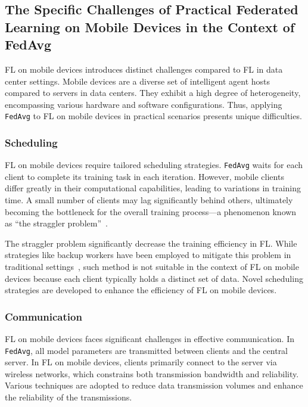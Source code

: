 \documentclass[conference]{IEEEtran}
\begin{document}
\subsection{The Specific Challenges of Practical Federated Learning on
Mobile Devices in the Context of FedAvg}

FL on mobile devices introduces distinct challenges compared to
FL in data center settings.
Mobile devices are a diverse set of intelligent agent hosts compared to
servers in data centers.
They exhibit a high degree of heterogeneity,
encompassing various hardware and software configurations.
Thus, applying \verb|FedAvg| to FL on mobile devices in practical scenarios
presents unique difficulties.

\subsubsection{Scheduling}

FL on mobile devices require tailored scheduling strategies.
\verb|FedAvg| waits for each client to complete its training task in
each iteration.
However, mobile clients differ greatly in their computational capabilities,
leading to variations in training time.
A small number of clients may lag significantly behind others,
ultimately becoming the bottleneck for the overall training process—a
phenomenon known as
``the straggler problem''~\cite{chen2020asynchronous,zheng2017asynchronous}.

The straggler problem significantly decrease the training efficiency in FL.
While strategies like backup workers have been employed to
mitigate this problem in traditional settings~\cite{chen2016revisiting},
such method is not suitable in the context of FL on mobile devices because
each client typically holds a distinct set of data.
Novel scheduling strategies are developed to
enhance the efficiency of FL on mobile devices.

\subsubsection{Communication}

FL on mobile devices faces significant challenges in effective communication.
In \verb|FedAvg|, all model parameters are transmitted between
clients and the central server.
In FL on mobile devices,
clients primarily connect to the server via wireless networks,
which constrains both transmission bandwidth and reliability.
Various techniques are adopted to reduce data transmission volumes
and enhance the reliability of the transmissions.
\end{document}
